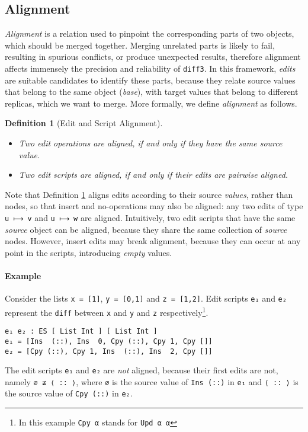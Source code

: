 \documentclass{sigplanconf}
\theoremstyle{plain}
\newtheorem{definition}{Definition}
\begin{document}
\subsection{Alignment}
\label{subsec:alignment}
%
\emph{Alignment} is a relation used to pinpoint the corresponding
parts of two objects, which should be merged together.
%
Merging unrelated parts is likely to fail, resulting in spurious
conflicts, or produce unexpected results, therefore alignment affects
immensely the precision and reliability of \texttt{diff3}.
%
In this framework, \emph{edits} are suitable candidates to identify
these parts, because they relate source values that belong to the same
object (\emph{base}), with target values that belong to different
replicas, which we want to merge.
%
More formally, we define \emph{alignment} as follows.
\begin{definition}[Edit and Script Alignment]
\mbox{}
\label{def:align}
\begin{itemize}
  \item Two edit operations are aligned, if and only if they have the same source value.
  \item Two edit scripts are aligned, if and only if their edits are
    pairwise aligned.
\end{itemize}
\end{definition}
Note that Definition \ref{def:align} aligns edits according to their
source \emph{values}, rather than nodes, so that insert and
no-operations may also be aligned: any two edits of type \texttt{u ⟼
  v} and \texttt{u ⟼ w} are aligned.
%	
Intuitively, two edit scripts that have the same \emph{source} object
can be aligned, because they share the same collection of
\emph{source} nodes.
%
However, insert edits may break alignment, because they can occur at
any point in the scripts, introducing \emph{empty} values.

\paragraph{Example}
Consider the lists \texttt{x = [1]}, \texttt{y = [0,1]} and \texttt{z
  = [1,2]}.
%
Edit scripts \texttt{e₁} and \texttt{e₂} represent the \texttt{diff}
between \texttt{x} and \texttt{y} and \texttt{z}
respectively\footnote{In this example \texttt{Cpy α} stands for \texttt{Upd α α}}.
\begin{verbatim}
e₁ e₂ : ES [ List Int ] [ List Int ]
e₁ = [Ins  (::), Ins  0, Cpy (::), Cpy 1, Cpy []]
e₂ = [Cpy (::), Cpy 1, Ins  (::), Ins  2, Cpy []] 
\end{verbatim}       
%
The edit scripts \texttt{e₁} and \texttt{e₂} are \emph{not} aligned, because
their first edits are not, namely \texttt{∅ ≢ ⟨ :: ⟩}, where
\texttt{∅} is the source value of \texttt{Ins (::)} in \texttt{e₁} and
\texttt{⟨ :: ⟩} is the source value of \texttt{Cpy (::)} in
\texttt{e₂}.
\end{document}
